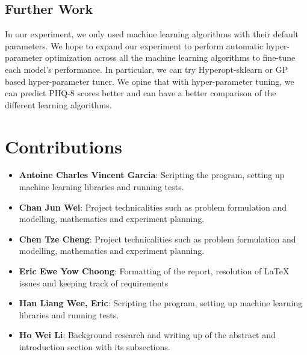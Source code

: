 \documentclass{article}
\begin{document}
	\subsection{Further Work}
	In our experiment, we only used machine learning algorithms with their default parameters. We hope to expand our experiment to perform automatic 
	hyper-parameter optimization across all the machine learning algorithms to fine-tune each model's performance. In particular, we can try 
	Hyperopt-sklearn\cite{Komer2014HyperoptsklearnAH} or GP based hyper-parameter tuner. We opine that with hyper-parameter tuning, we can predict PHQ-8 scores better and can have a better comparison	of the different learning algorithms.
	
	\section{Contributions}
	\begin{itemize}
		\item \textbf{Antoine Charles Vincent Garcia}: 
		Scripting the program, setting up machine learning libraries and running tests.
		\item \textbf{Chan Jun Wei}: 
		Project technicalities such as problem formulation and modelling, mathematics and experiment planning.
		\item \textbf{Chen Tze Cheng}: 
		Project technicalities such as problem formulation and modelling, mathematics and experiment planning.
		\item \textbf{Eric Ewe Yow Choong}: 
		Formatting of the report, resolution of LaTeX issues and keeping track of requirements
		\item \textbf{Han Liang Wee, Eric}: 
		Scripting the program, setting up machine learning libraries and running tests.
		\item \textbf{Ho Wei Li}: 
		Background research and writing up of the abstract and introduction section with its subsections.
	\end{itemize}
	
	\newpage
	
	{\scriptsize }
\end{document}
